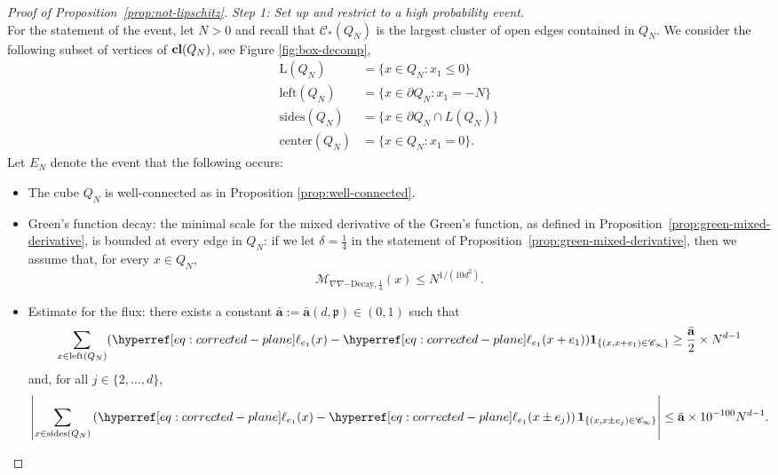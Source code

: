 \documentclass[12pt]{amsart}
\numberwithin{equation}{section}
\begin{document}
\begin{proof}[Proof of Proposition~\ref{prop:not-lipschitz}]
		{\it Step 1: Set up and restrict to a high probability event.} \\
		For the statement of the event, let $N > 0$ and recall that $\mathscr{C}_*(Q_N)$ is the largest cluster of open edges contained in $Q_N$. 
		We consider the following subset of vertices of $\mathbf{cl}(Q_N)$, see Figure \ref{fig:box-decomp},
		\begin{equation} \label{eq:box-decomp}
			\begin{aligned}
				\mbox{L}(Q_N) &= \{ x \in Q_N : x_1 \leq 0 \} \\
				\mbox{left}(Q_N) &= \{ x \in \partial Q_N : x_1 = -N\}  \\
				\mbox{sides}(Q_N) &= \{ x \in \partial Q_N \cap L(Q_N)\} \\
				\mbox{center}(Q_N) &= \{ x \in Q_N : x_1 = 0 \}.
			\end{aligned}
		\end{equation}
		Let $E_N$ denote the event that the following occurs: 
		\begin{itemize}
			\item The cube $Q_N$ is well-connected as in Proposition \ref{prop:well-connected}.
			\item Green's function decay: the minimal scale for the mixed derivative of the Green's function, as defined in Proposition~\ref{prop:green-mixed-derivative}, is bounded 
			at every edge in $Q_N$: if we let $\delta = \frac{1}{4}$ in the statement of Proposition~\ref{prop:green-mixed-derivative}, then we assume that, for every $x \in Q_N$,
			\[
			\mathcal{M}_{\nabla \nabla \mathrm{-Decay}, \frac 14}(x) \leq N^{1/(10 d^2)}.
			\]
			\item Estimate for the flux: there exists a constant $\bar{\mathbf{a}} := \bar{\mathbf{a}}(d , \mathfrak{p}) \in (0 , 1)$ such that
			\begin{equation} \label{eq:left-side-large}
				\sum_{x \in \mathrm{left}(Q_N)} (\ellp{e_1}(x) - \ellp{e_1}(x+e_1)) \mathbf{1}_{\{ (x,x+e_1) \in \mathscr{C}_{\infty}\}} \geq \frac{\bar{\mathbf{a}}}{2} \times N^{d-1} 
			\end{equation}
			and, for all $j \in \{ 2 , \ldots, d\}$, 
			\begin{equation} \label{eq:other-sides-small}
				\left| \sum_{x \in \mathrm{sides}(Q_N)} \left( \ellp{e_1}(x) - \ellp{e_1}(x \pm e_j) \right) \mathbf{1}_{\{ (x,x \pm e_j) \in \mathscr{C}_{\infty}\}} \right| \leq \bar{\mathbf{a}} \times 10^{-100} N^{d-1}.
			\end{equation}
		\end{itemize}

\end{proof}
\end{document}
